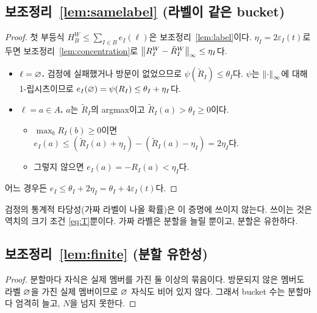 \subsection{보조정리~\ref{lem:samelabel} (라벨이 같은 bucket)}
\begin{proof}
첫 부등식 $H_B^W\le\sum_{I\in B}e_I(\ell)$은 보조정리~\ref{lem:label}이다. $\eta_I=2\varepsilon_I(t)$로 두면 보조정리~\ref{lem:concentration}로 $\left\lVert R_I^W-\tilde R_I^W\right\rVert_\infty\le\eta_I$다.
\begin{itemize}
  \item \textbf{$\ell=\varnothing$.} 검정에 실패했거나 방문이 없었으므로 $\psi(\tilde R_I)\le\theta_I$다. $\psi$는 $\left\lVert \cdot\right\rVert_\infty$에 대해 1-립시츠이므로 $e_I(\varnothing)=\psi(R_I)\le\theta_I+\eta_I$다.
  \item \textbf{$\ell=a\in A$.} $a$는 $\tilde R_I$의 argmax이고 $\tilde R_I(a)>\theta_I\ge0$이다.
    \begin{itemize}
      \item $\max_bR_I(b)\ge0$이면 $e_I(a)\le(\tilde R_I(a)+\eta_I)-(\tilde R_I(a)-\eta_I)=2\eta_I$다.
      \item 그렇지 않으면 $e_I(a)=-R_I(a)<\eta_I$다.
    \end{itemize}
\end{itemize}
어느 경우든 $e_I\le\theta_I+2\eta_I=\theta_I+4\varepsilon_I(t)$다.
\end{proof}
\noindent 검정의 통계적 타당성(가짜 라벨이 나올 확률)은 이 증명에 쓰이지 않는다. 쓰이는 것은 역치의 크기 조건 \eqref{eq:T}뿐이다. 가짜 라벨은 분할을 늘릴 뿐이고, 분할은 유한하다.

\subsection{보조정리~\ref{lem:finite} (분할 유한성)}
\begin{proof}
분할마다 자식은 실제 멤버를 가진 둘 이상의 묶음이다. 방문되지 않은 멤버도 라벨 $\varnothing$을 가진 실제 멤버이므로 $\varnothing$ 자식도 비어 있지 않다.
그래서 bucket 수는 분할마다 엄격히 늘고, $N$을 넘지 못한다.
\end{proof}

